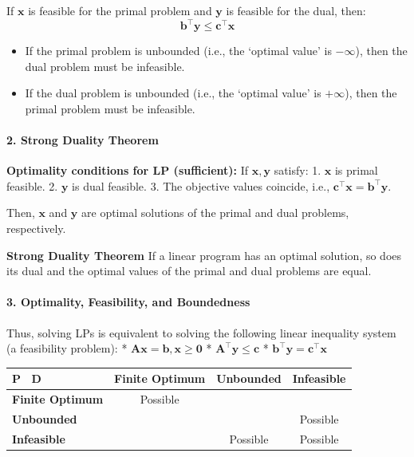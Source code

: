 \documentclass[11pt,a4paper]{article}
\providecommand{\tightlist}{\setlength{\itemsep}{0pt}\setlength{\parskip}{0pt}}
\begin{document}
If \(\boldsymbol{x}\) is feasible for the primal problem and \(\boldsymbol{y}\) is feasible for the dual, then: \[\boldsymbol{b}^\top \boldsymbol{y} \leq \boldsymbol{c}^\top \boldsymbol{x}\]

\begin{itemize}
\tightlist
\item
  If the primal problem is unbounded (i.e., the `optimal value' is \(-\infty\)), then the dual problem must be infeasible.
\item
  If the dual problem is unbounded (i.e., the `optimal value' is \(+\infty\)), then the primal problem must be infeasible.
\end{itemize}

\paragraph{2. Strong Duality Theorem}\label{strong-duality-theorem}

\textbf{Optimality conditions for LP (sufficient):} If \(\boldsymbol{x}, \boldsymbol{y}\) satisfy: 1. \(\boldsymbol{x}\) is primal feasible. 2. \(\boldsymbol{y}\) is dual feasible. 3. The objective values coincide, i.e., \(\boldsymbol{c}^\top \boldsymbol{x} = \boldsymbol{b}^\top \boldsymbol{y}\).

Then, \(\boldsymbol{x}\) and \(\boldsymbol{y}\) are optimal solutions of the primal and dual problems, respectively.

\textbf{Strong Duality Theorem} If a linear program has an optimal solution, so does its dual and the optimal values of the primal and dual problems are equal.

\paragraph{3. Optimality, Feasibility, and Boundedness}\label{optimality-feasibility-and-boundedness}

Thus, solving LPs is equivalent to solving the following linear inequality system (a feasibility problem): * \(\boldsymbol{Ax} = \boldsymbol{b}, \boldsymbol{x} \geq \mathbf{0}\) * \(\boldsymbol{A}^\top \boldsymbol{y} \leq \boldsymbol{c}\) * \(\boldsymbol{b}^\top \boldsymbol{y} = \boldsymbol{c}^\top \boldsymbol{x}\)

\begin{longtable}[]{@{}lccc@{}}
\toprule\noalign{}
P ~D & Finite Optimum & Unbounded & Infeasible \\
\midrule\noalign{}
\endhead
\bottomrule\noalign{}
\endlastfoot
\textbf{Finite Optimum} & Possible & & \\
\textbf{Unbounded} & & & Possible \\
\textbf{Infeasible} & & Possible & Possible \\
\end{longtable}
\end{document}
